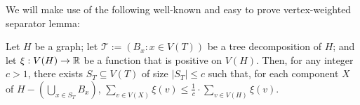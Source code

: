 \documentclass[kpfonts]{patmorin}
\theoremstyle{named}
\begin{document}
%
%
%
%

We will make use of the following well-known and easy to prove vertex-weighted separator lemma:

\begin{lem}\label{weighted-separator}
    Let $H$ be a graph; let $\mathcal{T}:=(B_x:x\in V(T))$ be a tree decomposition of $H$; and let $\xi:V(H)\to\mathbb{R}$ be a function that is positive on $V(H)$.  Then, for any integer $c>1$, there exists $S_T\subseteq V(T)$ of size $|S_T|\le c$ such that, for each component $X$ of $H-(\bigcup_{x\in S_T} B_x)$, $\sum_{v\in V(X)} \xi(v) \le \tfrac{1}{c}\cdot\sum_{v\in V(H)} \xi(v)$.
\end{lem}
\end{document}
